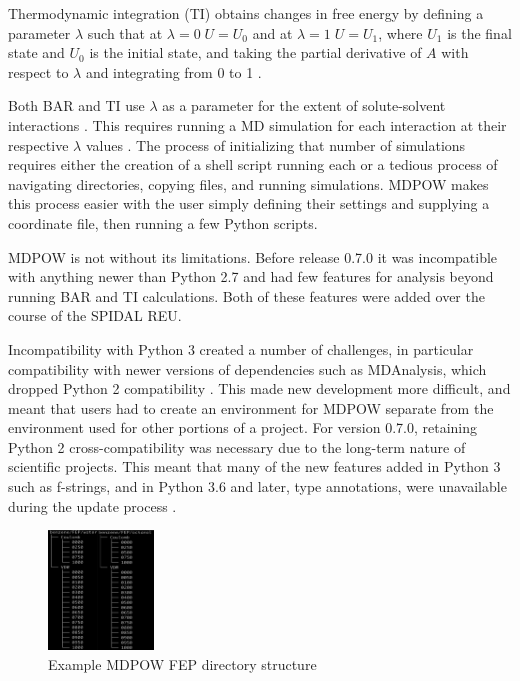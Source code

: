 \documentclass{article}[letterpaper, margins=1in, 12pt]
\begin{document}
Thermodynamic integration (TI) obtains changes in free energy by defining a parameter $\lambda$ such that at $\lambda = 0 \; U = U_0$ and at $\lambda = 1 \; U = U_1$, where $U_1$ is the final state and $U_0$ is the initial state, and taking the partial derivative of $A$ with respect to $\lambda$ and integrating from 0 to 1 \cite{chipot_free_2007}.

Both BAR and TI use $\lambda$ as a parameter for the extent of solute-solvent interactions \cite{chipot_free_2007}. This requires running a MD simulation for  each interaction at their respective $\lambda$ values \cite{lemkul_proteins_2019}. The process of initializing that number of simulations requires either the creation of a shell script running each or a tedious process of navigating directories, copying files, and running simulations. MDPOW makes this process easier with the user simply defining their settings and supplying a coordinate file, then running a few Python scripts.

MDPOW is not without its limitations. Before release 0.7.0 it was incompatible with anything newer than Python 2.7 and had few features for analysis beyond running BAR and TI calculations. Both of these features were added over the course of the SPIDAL REU.

Incompatibility with Python 3 created a number of challenges, in particular compatibility with newer versions of dependencies such as MDAnalysis, which dropped Python 2 compatibility \cite{michaud-agrawal_mdanalysis_2011, gowers_mdanalysis_2016}. This made new development more difficult, and meant that users had to create an environment for MDPOW separate from the environment used for other portions of a project. For version 0.7.0, retaining Python 2 cross-compatibility was  necessary due to the long-term nature of scientific projects. This meant that many of the new features added in Python 3 such as f-strings, and in Python 3.6 and later, type annotations, were unavailable during the update process \cite{fan_precise_2021, beckstein_prediction_2012}.

\begin{figure}
	\centering
	\includegraphics[width=0.25\textwidth]{directory}
	\caption{Example MDPOW FEP directory structure}
	\label{fig:directory}
\end{figure}
\end{document}
